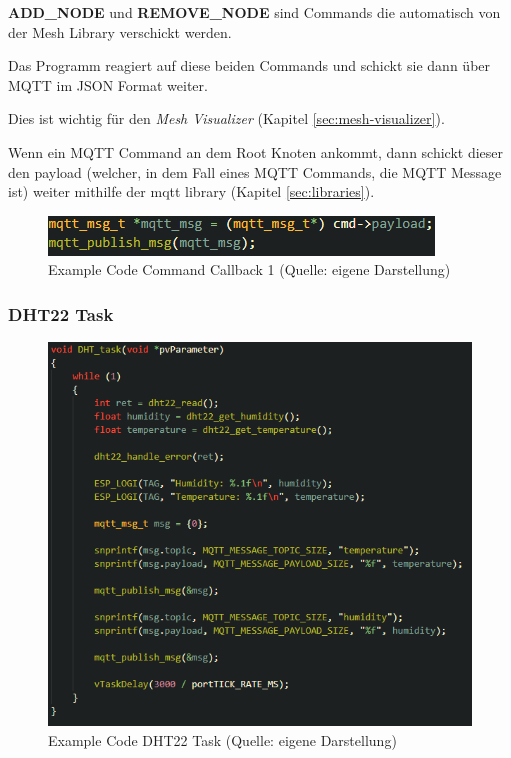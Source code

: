 \textbf{ADD\_NODE} und \textbf{REMOVE\_NODE} sind Commands die automatisch von der Mesh Library verschickt werden.

Das Programm reagiert auf diese beiden Commands und schickt sie dann über MQTT im JSON Format weiter.

Dies ist wichtig für den \textit{Mesh Visualizer} (Kapitel \ref{sec:mesh-visualizer}).

Wenn ein MQTT Command an dem Root Knoten ankommt, dann schickt dieser den payload (welcher, in dem Fall eines MQTT Commands, die MQTT Message ist) weiter mithilfe der mqtt library (Kapitel \ref{sec:libraries}).

\begin{figure}[H]
    \begin{center}
        \includegraphics[scale=0.8]{images/example_code_on_cmd_one.png}
        \caption{Example Code Command Callback 1 (Quelle: eigene Darstellung)}
        \label{abb:example_code_on_cmd_one}
    \end{center}
\end{figure}

\subsubsection{DHT22 Task}

\begin{figure}[H]
    \begin{center}
        \includegraphics[scale=0.8]{images/example_code_dht22_task.png}
        \caption{Example Code DHT22 Task (Quelle: eigene Darstellung)}
        \label{abb:example_code_dht22_task}
    \end{center}
\end{figure}


